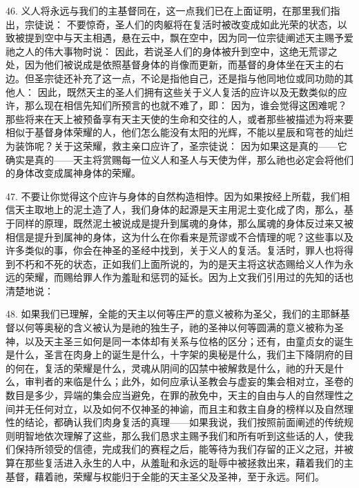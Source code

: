46. 义人将永远与我们的主基督同在，这一点我们已在上面证明，在那里我们指出，宗徒说： 不要惊奇，圣人们的肉躯将在复活时被改变成如此光荣的状态，以致被提到空中与天主相遇，悬在云中，飘在空中，因为同一位宗徒阐述天主赐予爱祂之人的伟大事物时说： 因此，若说圣人们的身体被升到空中，这绝无荒谬之处，因为他们被说成是依照基督身体的肖像而更新，而基督的身体坐在天主的右边。但圣宗徒还补充了这一点，不论是指他自己，还是指与他同地位或同功勋的其他人： 因此，既然天主的圣人们拥有这些关于义人复活的应许以及无数类似的应许，那么现在相信先知们所预言的也就不难了，即： 因为，谁会觉得这困难呢？那些将来在天上被预备享有天主天使的生命和交往的人，或者那些被描述为将来要相似于基督身体荣耀的人，他们怎么能没有太阳的光辉，不能以星辰和穹苍的灿烂为装饰呢？关于这荣耀，救主亲口应许了，圣宗徒说： 因为如果这是真的——它确实是真的——天主将赏赐每一位义人和圣人与天使为伴，那么祂也必定会将他们的身体改变成属神身体的荣耀。\par

47. 不要让你觉得这个应许与身体的自然构造相悖。因为如果按经上所载，我们相信天主取地上的泥土造了人，我们身体的起源是天主用泥土变化成了肉，那么，基于同样的原理，既然泥土被说成是提升到属魂的身体，那么属魂的身体反过来又被相信是提升到属神的身体，这为什么在你看来是荒谬或不合情理的呢？这些事以及许多类似的事，你会在神圣的圣经中找到，关于义人的复活。复活时，罪人也将得到不朽和不死的状态，正如我们上面所说的，为的是天主将这状态赐给义人作为永远的荣耀，而赐给罪人作为羞耻和惩罚的延长。因为上文我们引用过的先知的话也清楚地说：\par

48. 如果我们已理解，全能的天主以何等庄严的意义被称为圣父，我们的主耶稣基督以何等奥秘的含义被认为是祂的独生子，祂的圣神以何等圆满的意义被称为圣神，以及天主圣三如何是同一本体却有关系与位格的区分；还有，由童贞女的诞生是什么，圣言在肉身上的诞生是什么，十字架的奥秘是什么，我们主下降阴府的目的何在，复活的荣耀是什么，灵魂从阴间的囚禁中被解救是什么，祂的升天是什么，审判者的来临是什么；此外，如何应承认圣教会与虚妄的集会相对立，圣卷的数目是多少，异端的集会应当避免，在罪的赦免中，天主的自由与人的自然理性之间并无任何对立，以及如何不仅神圣的神谕，而且主和救主自身的榜样以及自然理性的结论，都确认我们肉身复活的真理——如果我说，我们按照前面阐述的传统规则明智地依次理解了这些，那么我们恳求主赐予我们和所有听到这些话的人，使我们保持所领受的信德，完成我们的赛程之后，能等待为我们存留的正义之冠，并被算在那些复活进入永生的人中，从羞耻和永远的耻辱中被拯救出来，藉着我们的主基督，藉着祂，荣耀与权能归于全能的天主圣父及圣神，至于永远。阿们。\par

